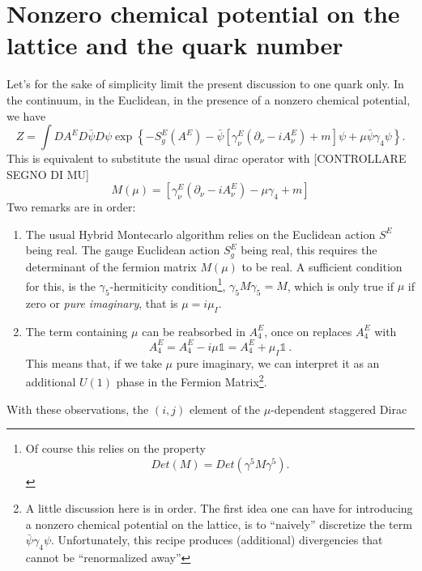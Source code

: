 \section{Nonzero chemical potential on the lattice and the quark number}

Let's for the sake of simplicity limit the present discussion to one quark only. In the 
continuum, in the Euclidean, in the presence of a nonzero chemical potential, we have 
\begin{equation}
 Z = \int DA^E D\bar{\psi}D \psi \exp{\left\{-S_g^E(A^E) - \bar{\psi}\left[ 
\gamma_\nu^E \left( \partial_\nu - i A_\nu^E \right) + m \right]\psi + \mu \bar{\psi} 
\gamma_4 \psi \right\} }.
\end{equation}
This is equivalent to substitute the usual dirac operator with [CONTROLLARE SEGNO DI MU]
\begin{equation}
 M(\mu) = \left[ \gamma_\nu^E \left( \partial_\nu - i A_\nu^E \right) - \mu \gamma_4 
+ m \right]
\end{equation}
Two remarks are in order: 
\begin{enumerate}
 \item The usual Hybrid Montecarlo algorithm relies on the Euclidean action $S^E$ being 
real. The gauge Euclidean action $S_g^E$ being real, this requires the determinant of 
the fermion matrix $M(\mu)$ to be real. A sufficient condition for this, is the 
$\gamma_5$-hermiticity condition\footnote{Of course this relies on the property 
\begin{equation}
 Det(M) = Det(\gamma^5 M \gamma^5) . \nonumber
\end{equation}
}, 
$\gamma_5 M \gamma_5 = M$, which is only true if $\mu$ if zero or \emph{pure 
imaginary}, that is $\mu = i \mu_I$.
 \item The term containing $\mu$ can be reabsorbed in $A_4^E$, once on replaces $A_4^E$ 
with
\begin{equation}
 A_4^E = A_4^E - i \mu \mathbb{1} =  A_4^E + \mu_I \mathbb{1} \ . 
\end{equation}
This means that, if we take $\mu$ pure imaginary, we can interpret it as an additional 
$U(1)$ phase in the Fermion Matrix\footnote{
A little discussion here is in order. The first idea one can have for introducing a 
nonzero chemical potential on the lattice, is to ``naively'' discretize the term
$\bar{\psi}\gamma_4\psi$. Unfortunately, this recipe produces (additional) divergencies 
that cannot be ``renormalized away''}. 
\end{enumerate}
With these observations, the $(i,j)$ element of the $\mu$-dependent staggered Dirac 
